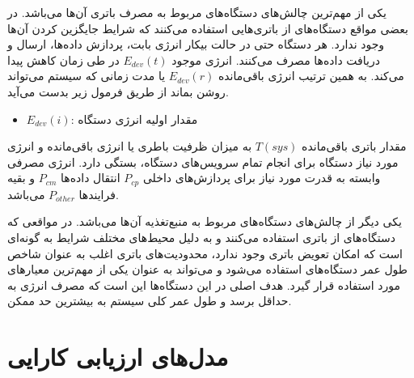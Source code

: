 \documentclass[a4paper]{article}
\begin{document}
یکی از مهم‌ترین چالش‌های دستگاه‌های  مربوط به مصرف باتری آن‌ها می‌باشد.
در بعضی مواقع دستگاه‌های  از باتری‌هایی استفاده می‌کنند که شرایط جایگزین
کردن آن‌ها وجود ندارد. هر دستگاه  حتی در حالت بیکار انرژی بابت، پردازش
داده‌ها، ارسال و دریافت داده‌ها مصرف می‌کنند. انرژی موجود $E_{dev}(t)$ در طی
زمان کاهش پیدا می‌کند. به همین ترتیب انرژی باقی‌مانده $E_{dev}(r)$ یا مدت زمانی
که سیستم می‌تواند روشن بماند از طریق فرمول زیر بدست می‌آید.


\begin{itemize}
    \item $E_{dev}(i)$: مقدار اولیه انرژی دستگاه
\end{itemize}

مقدار باتری باقی‌مانده $T(sys)$ به میزان ظرفیت باطری یا انرژی باقی‌مانده و انرژی
مورد نیاز دستگاه برای انجام تمام سرویس‌های دستگاه، بستگی دارد. انرژی مصرفی
وابسته به قدرت مورد نیاز برای پردازش‌های داخلی $P_{cp}$ انتقال داده‌ها $P_{cm}$
و بقیه فرایند‌ها $P_{other}$ می‌باشد.


یکی دیگر از چالش‌های دستگاه‌های  مربوط به منبع‌تغذیه آن‌ها می‌باشد. در
مواقعی که دستگاه‌های  از باتری استفاده می‌کنند و به دلیل محیط‌های مختلف
شرایط به گونه‌ای است که امکان تعویض باتری وجود ندارد، محدودیت‌های باتری اغلب به
عنوان شاخص طول عمر دستگاه‌های  استفاده می‌شود و می‌تواند به عنوان یکی از
مهم‌ترین معیار‌های  مورد استفاده قرار گیرد. هدف اصلی در این دستگاه‌ها
این است که مصرف انرژی به حداقل برسد و طول عمر کلی سیستم به بیشترین حد ممکن.

\section{مدل‌های ارزیابی کارایی}

\newpage


\end{document}
